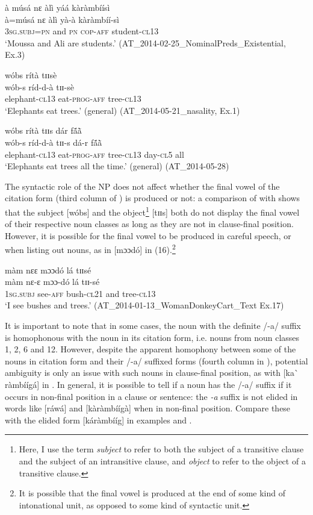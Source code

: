 \documentclass[output=paper]{langsci/langscibook}
\begin{document}
\ea\label{ex:teo:13}
à músá nɛ àlì yáá kàràmbíísì\\
\gll à=músá nɛ àlì yà-à kàràmbíí-sì\\
\textsc{3sg.subj=pn} and \textsc{pn} \textsc{cop-aff} student-\textsc{cl13}\\
\glt ‘Moussa and Ali are students.’ (AT\_2014-02-25\_NominalPreds\_Existential, Ex.3)
\z

\ea\label{ex:teo:14}
wóbs rítà tɪɪsè\\
\gll wób-s ríd-d-à tɪɪ-sè\\
elephant-\textsc{cl13} eat-\textsc{prog-aff} tree-\textsc{cl13}\\
\glt ‘Elephants eat trees.’ (general) (AT\_2014-05-21\_nasality, Ex.1)
\z

\ea\label{ex:teo:15}
wóbs rítà tɪɪs dár f\'{ã}\`{ã}\\
\gll wób-s ríd-d-à tɪɪ-s dá-r f\'{ã}\`{ã}\\
elephant-\textsc{cl13} eat-\textsc{prog-aff} tree-\textsc{cl13} day-\textsc{cl5} all\\
\glt ‘Elephants eat trees all the time.’ (general) (AT\_2014-05-28)
\z

The syntactic role of the NP does not affect whether the final vowel of the citation form (third column of ) is produced or not: a comparison of  with  shows that the subject [wóbs] and the object\footnote{Here, I use the term \textit{subject} to refer to both the subject of a transitive clause and the subject of an intransitive clause, and \textit{object} to refer to the object of a transitive clause.} [tɪɪs] both do not display the final vowel of their respective noun classes as long as they are not in clause-final position. However, it is possible for the final vowel to be produced in careful speech, or when listing out nouns, as in [mɔɔdó] in (16).\footnote{It is possible that the final vowel is produced at the end of some kind of intonational unit, as opposed to some kind of syntactic unit.}

\ea\label{ex:teo:16}
màm nɛɛ mɔɔdó lá tɪɪsé\\
\gll màm nɛ-ɛ mɔɔ-dó lá tɪɪ-sé\\
1\textsc{sg.subj} see-\textsc{aff} bush-\textsc{cl21} and tree-\textsc{cl13}\\
\glt ‘I see bushes and trees.’ (AT\_2014-01-13\_WomanDonkeyCart\_Text Ex.17)
\z

It is important to note that in some cases, the noun with the definite /-a/ suffix is homophonous with the noun in its citation form, i.e. nouns from noun classes 1, 2, 6 and 12. However, despite the apparent homophony between some of the nouns in citation form and their /-a/ suffixed forms (fourth column in ), potential ambiguity is only an issue with such nouns in clause-final position, as with [ka\`{} ràmbíígá] in . In general, it is possible to tell if a noun has the /-a/ suffix if it occurs in non-final position in a clause or sentence: the \textit{-a} suffix is not elided in words like [ráwá]  and [kàràmbíígà]  when in non-final position. Compare these with the elided form [káràmbííg] in examples  and .
\end{document}
